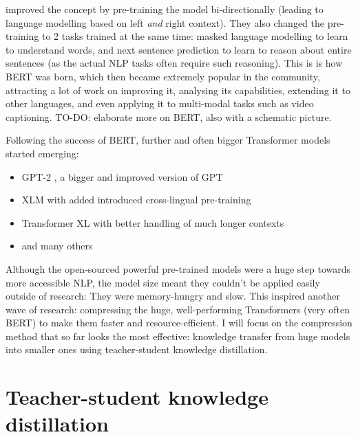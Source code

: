 \documentclass[bsc,frontabs,twoside,singlespacing,parskip,deptreport]{infthesis}
\begin{document}
{{    \citet{Devlin_2018} improved the concept by pre-training the model bi-directionally (leading to language modelling based on left \textit{and} right context). They also changed the pre-training to 2 tasks trained at the same time: masked language modelling to learn to understand words, and next sentence prediction to learn to reason about entire sentences (as the actual NLP tasks often require such reasoning). This is is how BERT was born, which then became extremely popular in the community, attracting a lot of work on improving it, analysing its capabilities, extending it to other languages, and even applying it to multi-modal tasks such as video captioning. TO-DO: elaborate more on BERT, also with a schematic picture.
    
    Following the success of BERT, further and often bigger Transformer models started emerging:
    \begin{itemize}
      \item GPT-2 \citep{Radford_2019}, a bigger and improved version of GPT
      \item XLM \citep{Lample_2019} with added introduced cross-lingual pre-training
      \item Transformer XL \citep{Dai_2019} with better handling of much longer contexts
      \item and many others
    \end{itemize}

    Although the open-sourced powerful pre-trained models were a huge step towards more accessible NLP, the model size meant they couldn't be applied easily outside of research: They were memory-hungry and slow. 
    This inspired another wave of research: compressing the huge, well-performing Transformers (very often BERT) to make them faster and resource-efficient. 
    I will focus on the compression method that so far looks the most effective: knowledge transfer from huge models into smaller ones using teacher-student knowledge distillation.
  }

  \section{Teacher-student knowledge distillation}{
}}
\end{document}
